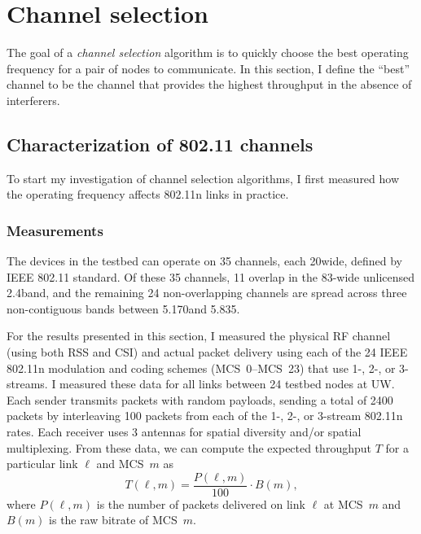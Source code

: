 \section{Channel selection}\label{sec:esnr_chansel}
The goal of a \emph{channel selection} algorithm is to quickly choose the best operating frequency for a pair of nodes to communicate. In this section, I define the ``best'' channel to be the channel that provides the highest throughput in the absence of interferers.

\subsection{Characterization of 802.11 channels}
To start my investigation of channel selection algorithms, I first measured how the operating frequency affects 802.11n links in practice.

\subsubsection{Measurements}
\label{sec:chan_sel_data}
The  devices in the testbed can operate on 35 channels, each 20\MHz wide, defined by IEEE 802.11 standard. Of these 35 channels, 11 overlap in the 83-\MHz wide unlicensed 2.4\GHz band, and the remaining 24 non-overlapping channels are spread across three non-contiguous bands between 5.170\GHz and 5.835\GHz.

For the results presented in this section, I measured the physical RF channel (using both RSS and CSI) and actual packet delivery using each of the 24 IEEE 802.11n modulation and coding schemes (MCS~0--MCS~23) that use  1-, 2-, or 3-streams. I measured these data for all links between 24 testbed nodes at UW\@. Each sender transmits packets with random payloads, sending a total of 2400 packets by interleaving 100 packets from each of the 1-, 2-, or 3-stream 802.11n rates. Each receiver uses 3 antennas for spatial diversity and/or spatial multiplexing. From these data, we can compute the expected throughput $T$ for a particular link $\ell$ and MCS~$m$ as
\begin{equation}
	\label{eq:prr_throughput}
	T(\ell,m) = \frac{P(\ell,m)}{100} \cdot B(m),
\end{equation}
where $P(\ell,m)$ is the number of packets delivered on link $\ell$ at MCS~$m$ and $B(m)$ is the raw bitrate of MCS~$m$.

